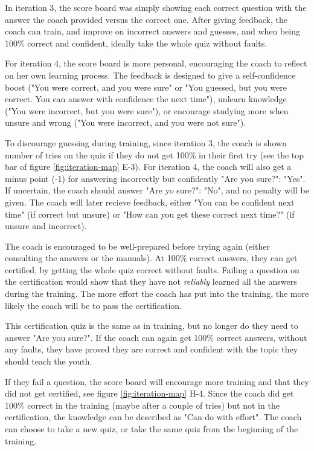   In iteration 3, the score board was simply showing each correct question with the answer the coach provided versus the correct one. After giving feedback, the coach can train, and improve on incorrect answers and guesses, and when being 100\% correct and confident, ideally take the whole quiz without faults.

  For iteration 4, the score board is more personal, encouraging the coach to reflect on her own learning process. The feedback is designed to give a self-confidence boost ("You were correct, and you were sure" or "You guessed, but you were correct. You can answer with confidence the next time"), unlearn knowledge ("You were incorrect, but you were sure"), or encourage studying more when unsure and wrong ("You were incorrect, and you were not sure").

  To discourage guessing during training, since iteration 3, the coach is shown number of tries on the quiz if they do not get 100\% in their first try (see the top bar of figure \ref{fig:iteration-map} E-3). For iteration 4, the coach will also get a minus point (-1) for answering incorrectly but confidently "Are you sure?": "Yes". If uncertain, the coach should answer "Are yo sure?": "No", and no penalty will be given. The coach will later recieve feedback, either "You can be confident next time" (if correct but unsure) or "How can you get these correct next time?" (if unsure and incorrect).

  The coach is encouraged to be well-prepared before trying again (either consulting the answers or the manuals). At 100\% correct answers, they can get certified, by getting the whole quiz correct without faults. Failing a question on the certification would show that they have not \textit{reliably} learned all the answers during the training. The more effort the coach has put into the training, the more likely the coach will be to pass the certification.


   This certification quiz is the same as in training, but no longer do they need to answer "Are you sure?". If the coach can again get 100\% correct answers, without any faults, they have proved they are correct and confident with the topic they should teach the youth.

   If they fail a question, the score board will encourage more training and that they did not get certified, see figure \ref{fig:iteration-map} H-4. Since the coach did get 100\% correct in the training (maybe after a couple of tries) but not in the certification, the knowledge can be described as "Can do with effort". The coach can choose to take a new quiz, or take the same quiz from the beginning of the training.

